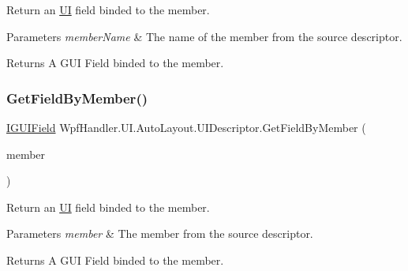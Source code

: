 Return an \mbox{\hyperlink{namespace_wpf_handler_1_1_u_i}{UI}} field binded to the member. 


\begin{DoxyParams}{Parameters}
{\em member\+Name} & The name of the member from the source descriptor.\\
\hline
\end{DoxyParams}
\begin{DoxyReturn}{Returns}
A G\+UI Field binded to the member.
\end{DoxyReturn}
\mbox{\label{class_wpf_handler_1_1_u_i_1_1_auto_layout_1_1_u_i_descriptor_ab965d93a86ca10bb9e7b30ac14fcfad8}} 
\subsubsection{\texorpdfstring{Get\+Field\+By\+Member()}{GetFieldByMember()}\hspace{0.1cm}{\footnotesize\ttfamily [2/2]}}
{\footnotesize\ttfamily \mbox{\hyperlink{interface_wpf_handler_1_1_u_i_1_1_auto_layout_1_1_i_g_u_i_field}{I\+G\+U\+I\+Field}} Wpf\+Handler.\+U\+I.\+Auto\+Layout.\+U\+I\+Descriptor.\+Get\+Field\+By\+Member (\begin{DoxyParamCaption}\item[{Member\+Info}]{member }\end{DoxyParamCaption})}



Return an \mbox{\hyperlink{namespace_wpf_handler_1_1_u_i}{UI}} field binded to the member. 


\begin{DoxyParams}{Parameters}
{\em member} & The member from the source descriptor.\\
\hline
\end{DoxyParams}
\begin{DoxyReturn}{Returns}
A G\+UI Field binded to the member.
\end{DoxyReturn}
\mbox{\label{class_wpf_handler_1_1_u_i_1_1_auto_layout_1_1_u_i_descriptor_a129506a55a400487664febab7ea85266}} 
